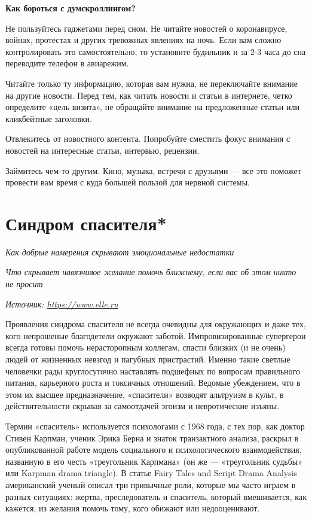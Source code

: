 \textbf{Как бороться с думскроллингом?}

Не пользуйтесь гаджетами перед сном. Не читайте новостей о коронавирусе, войнах, протестах и других тревожных явлениях на ночь. Если вам сложно контролировать это самостоятельно, то установите будильник и за 2-3 часа до сна переводите телефон в авиарежим.

Читайте только ту информацию, которая вам нужна, не переключайте внимание на другие новости. Перед тем, как читать новости и статьи в интернете, четко определите «цель визита», не обращайте внимание на предложенные статьи или кликбейтные заголовки.

Отвлекитесь от новостного контента. Попробуйте сместить фокус внимания с новостей на интересные статьи, интервью, рецензии.

Займитесь чем-то другим. Кино, музыка, встречи с друзьями  ---  все это поможет провести вам время с куда большей пользой для нервной системы.

\newpage
\section{Синдром спасителя*}

\textit{Как добрые намерения скрывают эмоциональные недостатки}

\textit{Что скрывает навязчивое желание помочь ближнему, если вас об этом никто не просит}

\textit{Источник: \url{https://www.elle.ru}}

Проявления синдрома спасителя не всегда очевидны для окружающих и даже тех, кого непрошеные благодетели окружают заботой. Импровизированные супергерои всегда готовы помочь нерасторопным коллегам, спасти близких (и не очень) людей от жизненных невзгод и пагубных пристрастий. Именно такие светлые человечки рады круглосуточно наставлять подшефных по вопросам правильного питания, карьерного роста и токсичных отношений. Ведомые убеждением, что в этом их высшее предназначение, «спасители» возводят альтруизм в культ, в действительности скрывая за самоотдачей эгоизм и невротические изъяны.

Термин «спаситель» используется психологами с 1968 года, с тех пор, как доктор Стивен Карпман, ученик Эрика Берна и знаток транзактного анализа, раскрыл в опубликованной работе модель социального и психологического взаимодействия, названную в его честь «треугольник Карпмана» (он же  ---  «треугольник судьбы» или Karpman drama triangle). В статье Fairy Tales and Script Drama Analysis американский ученый описал три привычные роли, которые мы часто играем в разных ситуациях: жертва, преследователь и спаситель, который вмешивается, как кажется, из желания помочь тому, кого обижают или недооценивают.

